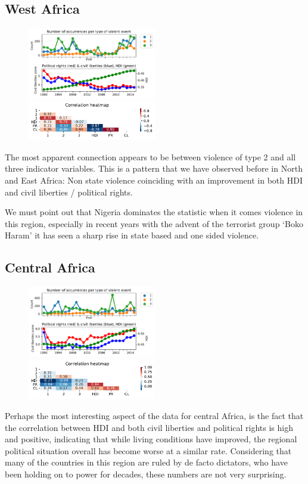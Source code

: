 \documentclass[a4paper,11pt]{article}
\begin{document}
\subsection{West Africa}
\begin{figure}[ht!]
    \includegraphics[width=0.50\textwidth]{images/wa.pdf}
    \includegraphics[width=0.50\textwidth]{images/wa_corr.pdf}
\end{figure}
The most apparent connection appears to be between violence of type 2 and all three indicator variables. This is a pattern that we have observed before in North and East Africa: Non state violence coinciding with an improvement in both HDI and civil liberties / political rights. 

We must point out that Nigeria dominates the statistic when it comes violence in this region, especially in recent years with the advent of the terrorist group `Boko Haram' it has seen a sharp rise in state based and one sided violence.

\subsection{Central Africa}
\begin{figure}[ht!]
    \includegraphics[width=0.50\textwidth]{images/ca.pdf}
    \includegraphics[width=0.50\textwidth]{images/ca_corr.pdf}
\end{figure}
Perhaps the most interesting aspect of the data for central Africa, is the fact that the correlation between HDI and both civil liberties and political rights is high and positive, indicating that while living conditions have improved, the regional political situation overall has become worse at a similar rate. Considering that many of the countries in this region are ruled by de facto dictators, who have been holding on to power for decades, these numbers are not very surprising.
\end{document}
